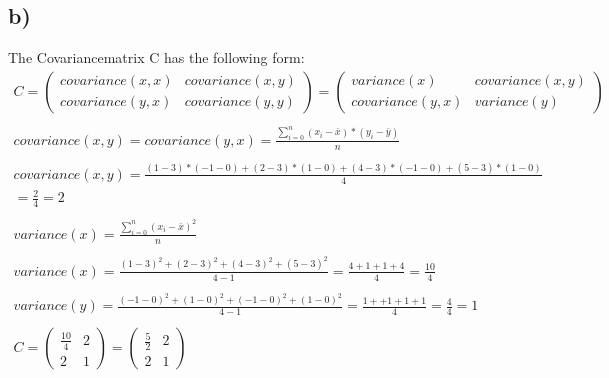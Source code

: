 \documentclass[12pt]{article}
\begin{document}
\subsection{b)}
The Covariancematrix C has the following form:
\begin{gather*}
    C = 
    \begin{pmatrix}
        covariance(x,x) & covariance(x,y) \\
        covariance(y,x) & covariance(y,y)
    \end{pmatrix}
    =
    \begin{pmatrix}
        variance(x) & covariance(x,y) \\
        covariance(y,x) & variance(y)
    \end{pmatrix}
    \\ \\
    covariance(x,y) = covariance(y,x) =  \frac{\displaystyle\sum_{i=0}^{n} (x_i - \bar{x}) * (y_i - \bar{y}) }{n}
    \\ \\
    covariance(x,y) = \frac{(1-3)*(-1-0) + (2-3)*(1-0) + (4-3)*(-1-0)+(5-3)*(1-0)}{4} \\ 
    = \frac{2}{4} = 2
    \\ \\
    variance(x) = \frac{\displaystyle\sum_{i=0}^{n} (x_i -\bar{x})^2}{n}
    \\ \\
    variance(x) = \frac{(1-3)^2 + (2-3)^2 +(4-3)^2 +(5-3)^2}{4-1} = \frac{ 4 + 1 + 1 + 4}{4}= \frac{10}{4}
    \\ \\
    variance(y) = \frac{(-1 -0)^2 + (1-0)^2 +(-1 -0)^2 + (1-0)^2}{4-1} = \frac{ 1+ +1 +1 +1}{4} = \frac{4}{4} = 1
    \\ \\
   C =  \begin{pmatrix}
       \frac{10}{4} & 2 \\
       2 &  1
    \end{pmatrix}
    =\begin{pmatrix}
        \frac{5}{2} & 2 \\
       2 &  1
    \end{pmatrix}
\end{gather*}
\end{document}
